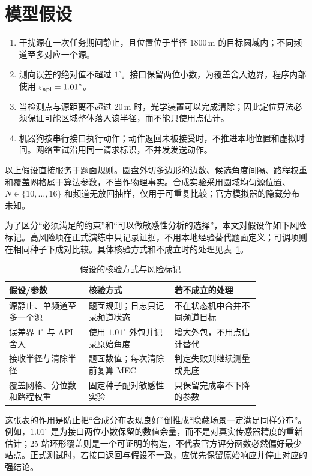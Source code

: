 \section{模型假设}
\begin{enumerate}
\item 干扰源在一次任务期间静止，且位置位于半径 $1800\,\mathrm m$ 的目标圆域内；不同频道至多对应一个源。
\item 测向误差的绝对值不超过 $1^\circ$。接口保留两位小数，为覆盖舍入边界，程序内部使用 $\varepsilon_{\rm api}=1.01^\circ$。
\item 当检测点与源距离不超过 $20\,\mathrm m$ 时，光学装置可以完成清除；因此定位算法必须保证可能区域整体落入该半径，而不能只使用点估计。
\item 机器狗按串行接口执行动作；动作返回未被接受时，不推进本地位置和虚拟时间。网络重试沿用同一请求标识，不并发发送动作。
\end{enumerate}

以上假设直接服务于题面规则。圆盘外切多边形的边数、候选角度间隔、路程权重和覆盖网格属于算法参数，不当作物理事实。合成实验采用圆域均匀源位置、$N\in\{10,\ldots,16\}$ 和频道无放回抽样，仅用于可重复比较；官方模拟器的隐藏分布未知。

为了区分“必须满足的约束”和“可以做敏感性分析的选择”，本文对假设作如下风险标记。高风险项在正式演练中只记录证据，不用本地经验替代题面定义；可调项则在相同种子下成对比较。具体核验方式和不成立时的处理见表~\ref{tab:q1-assumption-risk}。

\begin{table}[H]\centering\small
\caption{假设的核验方式与风险标记}\label{tab:q1-assumption-risk}
\begin{tabular}{p{0.26\linewidth}p{0.28\linewidth}p{0.29\linewidth}}
\toprule
假设/参数 & 核验方式 & 若不成立的处理 \\
\midrule
源静止、单频道至多一个源 & 题面规则；日志只记录频道状态 & 不在状态机中合并不同频道目标 \\
误差界 $1^\circ$ 与 API 舍入 & 使用 $1.01^\circ$ 外包并记录原始角度 & 增大外包，不用点估计替代 \\
接收半径与清除半径 & 题面数值；每次清除前复算 MEC & 判定失败则继续测量或兜底 \\
覆盖网格、分位数和路程权重 & 固定种子配对敏感性实验 & 只保留完成率不下降的参数 \\
\bottomrule
\end{tabular}
\end{table}

这张表的作用是防止把“合成分布表现良好”倒推成“隐藏场景一定满足同样分布”。例如，$1.01^\circ$ 是为接口两位小数保留的数值余量，而不是对真实传感器精度的重新估计；25 站环形覆盖则是一个可证明的构造，不代表官方评分函数必然偏好最少站点。正式测试时，若接口返回与假设不一致，应优先保留原始响应并停止对应的强结论。

